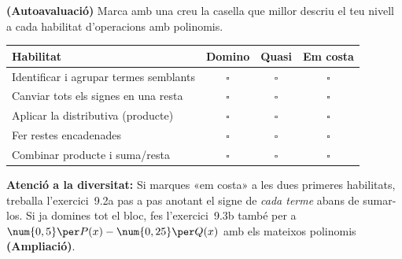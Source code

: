 \begin{exercicis}
\begin{exlist}
  \item \textbf{(Autoavaluació)} Marca amb una creu la casella que millor
        descriu el teu nivell a cada habilitat d'operacions amb polinomis.
        \begin{center}
        \renewcommand{\arraystretch}{1.4}
        \begin{tabular}{|p{6.5cm}|c|c|c|}
        \hline
        \textbf{Habilitat} & \textbf{Domino} & \textbf{Quasi} & \textbf{Em costa} \\
        \hline
        Identificar i agrupar termes semblants & $\square$ & $\square$ & $\square$ \\
        \hline
        Canviar tots els signes en una resta & $\square$ & $\square$ & $\square$ \\
        \hline
        Aplicar la distributiva (producte) & $\square$ & $\square$ & $\square$ \\
        \hline
        Fer restes encadenades & $\square$ & $\square$ & $\square$ \\
        \hline
        Combinar producte i suma/resta & $\square$ & $\square$ & $\square$ \\
        \hline
        \end{tabular}
        \end{center}

\textbf{Atenció a la diversitat:} Si marques «em costa» a les dues
primeres habilitats, treballa l'exercici~9.2a pas a pas anotant el signe
de \emph{cada terme} abans de sumar-los. Si ja domines tot el bloc, fes
l'exercici~9.3b també per a $\num{0,5}\per P(x) - \num{0,25}\per Q(x)$
amb els mateixos polinomis \textbf{(Ampliació)}.
\end{exlist}
\end{exercicis}

